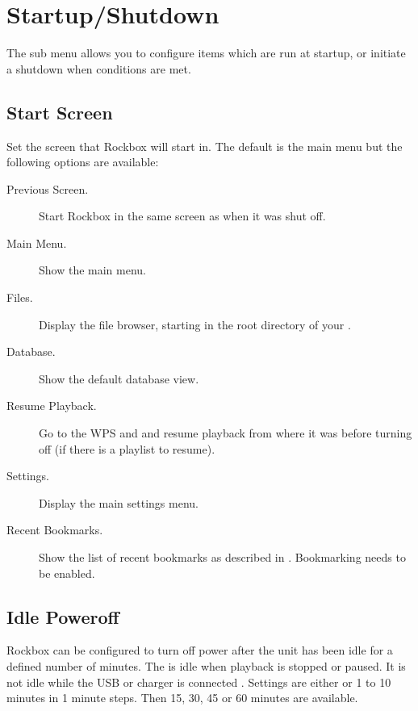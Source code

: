 
\section{\label{ref:StartupShutdownOptions}Startup/Shutdown}

The  sub menu allows you to configure items which
are run at startup, or initiate a shutdown when conditions are met.

\subsection{Start Screen}
  Set the screen that Rockbox will start in. The default is the main menu but
  the following options are available:
  \begin{description}
    \item[Previous Screen.] Start Rockbox in the same screen as when it was
    shut off.
    \item[Main Menu.] Show the main menu.
    \item[Files.] Display the file browser, starting in the root directory of
    your \dap.
    \item[Database.] Show the default database view.
    \item[Resume Playback.] Go to the WPS and and resume playback from where
    it was before turning off (if there is a playlist to resume).
    \item[Settings.] Display the main settings menu.
    \item[Recent Bookmarks.] Show the list of recent bookmarks as
      described in . Bookmarking needs
      to be enabled.
  \end{description}

\subsection{\label{ref:IdlePoweroffSetting}Idle Poweroff}
  Rockbox can be configured to turn off power after the unit has been idle for
  a defined number of minutes. The \dap{} is idle when playback is stopped or
  paused. It is not idle while the USB or charger is connected
  .
  Settings are either  or 1 to 10 minutes in 1 minute steps. Then
  15, 30, 45 or 60 minutes are available.

